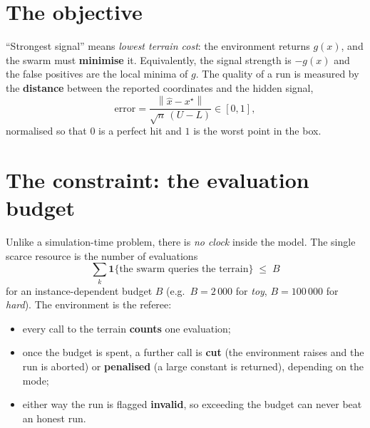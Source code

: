 \documentclass[11pt,a4paper]{article}
\newcommand{\norm}[1]{\left\lVert #1 \right\rVert}
\begin{document}
\section{The objective}

``Strongest signal'' means \emph{lowest terrain cost}: the environment returns
$g(x)$, and the swarm must \textbf{minimise} it. Equivalently, the signal
strength is $-g(x)$ and the false positives are the local minima of $g$. The
quality of a run is measured by the \textbf{distance} between the reported
coordinates and the hidden signal,
\begin{equation}
  \text{error} = \frac{\norm{\hat{x} - x^{\star}}}{\sqrt{n}\,(U - L)} \in [0, 1],
  \label{eq:error}
\end{equation}
normalised so that $0$ is a perfect hit and $1$ is the worst point in the box.

\section{The constraint: the evaluation budget}

Unlike a simulation-time problem, there is \emph{no clock} inside the model. The
single scarce resource is the number of evaluations
\begin{equation}
  \boxed{\; \sum_{k} \mathbf{1}\{\text{the swarm queries the terrain}\} \;\le\; B \;}
  \label{eq:budget}
\end{equation}
for an instance-dependent budget $B$ (e.g.\ $B = 2\,000$ for \emph{toy},
$B = 100\,000$ for \emph{hard}). The environment is the referee:

\begin{itemize}
  \item every call to the terrain \textbf{counts} one evaluation;
  \item once the budget is spent, a further call is \textbf{cut} (the environment
        raises and the run is aborted) or \textbf{penalised} (a large constant is
        returned), depending on the mode;
  \item either way the run is flagged \textbf{invalid}, so exceeding the budget
        can never beat an honest run.
\end{itemize}
\end{document}
